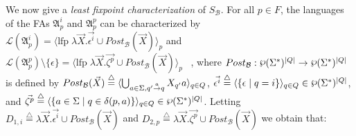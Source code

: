 We now give a \emph{least fixpoint characterization} of $S_{\mathcal{B}}$.
For all $p \in F$, the languages of the FAs $\mathfrak{A}^i_p$ and $\mathfrak{A}^p_p$
can be characterized by
$\mathcal{L}(\mathfrak{A}^i_p) = \langle \textrm{lfp} \; \lambda \vec{X} .
\vec{\epsilon^i} \cup Post_{\mathcal{B}}(\vec{X}) \rangle_{p}$ and
$\mathcal{L}(\mathfrak{A}^p_p) \setminus \{\epsilon\} = \langle \textrm{lfp} \;
\lambda \vec{X} .  \vec{\zeta^p} \cup Post_{\mathcal{B}}(\vec{X}) \rangle_{p}$
~\cite{ganty2019language}, where
$Post_{\mathcal{B}}: \powerset(\Sigma^*)^{|Q|} \rightarrow \powerset (\Sigma^*)^{|Q|}$
is defined by $Post_{\mathcal{B}}(\vec{X}) \overset{\triangle}{=}
\langle \bigcup_{a \in \Sigma, q' \overset{a}{\rightarrow} q} X_{q'}a \rangle_{q \in Q}$,
$\vec{\epsilon^i} \overset{\triangle}{=}
\langle \{ \epsilon \;|\; q = i\}\rangle_{q \in Q} \in \powerset(\Sigma^*)^{|Q|}$,
and $\vec{\zeta^p} \overset{\triangle}{=}
\langle \{ a \in \Sigma \;|\; q \in \delta (p,a)\}\rangle_{q \in Q}
\in \powerset(\Sigma^*)^{|Q|}$.
Letting $D_{1,i} \overset{\triangle}{=} \lambda \vec{X} .
\vec{\epsilon^i} \cup Post_{\mathcal{B}}(\vec{X})$ and
$D_{2,p} \overset{\triangle}{=} \lambda \vec{X} .  \vec{\zeta^p}
\cup Post_{\mathcal{B}}(\vec{X})$
we obtain that:

